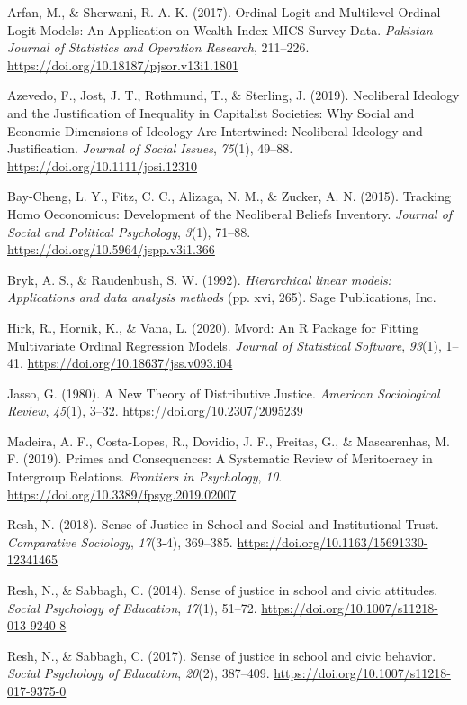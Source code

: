 \documentclass[
  12pt,
]{article}
\newlength{\cslhangindent}
\newenvironment{cslreferences}%
  {\setlength{\parindent}{0pt}%
  \everypar{\setlength{\hangindent}{\cslhangindent}}\ignorespaces}%
  {\par}
\begin{document}
\hypertarget{refs}{}
\begin{cslreferences}
\leavevmode\hypertarget{ref-arfan_Ordinal_2017}{}%
Arfan, M., \& Sherwani, R. A. K. (2017). Ordinal Logit and Multilevel
Ordinal Logit Models: An Application on Wealth Index MICS-Survey Data.
\emph{Pakistan Journal of Statistics and Operation Research}, 211--226.
\url{https://doi.org/10.18187/pjsor.v13i1.1801}

\leavevmode\hypertarget{ref-azevedo_Neoliberal_2019}{}%
Azevedo, F., Jost, J. T., Rothmund, T., \& Sterling, J. (2019).
Neoliberal Ideology and the Justification of Inequality in Capitalist
Societies: Why Social and Economic Dimensions of Ideology Are
Intertwined: Neoliberal Ideology and Justification. \emph{Journal of
Social Issues}, \emph{75}(1), 49--88.
\url{https://doi.org/10.1111/josi.12310}

\leavevmode\hypertarget{ref-bay-cheng_Tracking_2015a}{}%
Bay-Cheng, L. Y., Fitz, C. C., Alizaga, N. M., \& Zucker, A. N. (2015).
Tracking Homo Oeconomicus: Development of the Neoliberal Beliefs
Inventory. \emph{Journal of Social and Political Psychology},
\emph{3}(1), 71--88. \url{https://doi.org/10.5964/jspp.v3i1.366}

\leavevmode\hypertarget{ref-bryk_Hierarchical_1992}{}%
Bryk, A. S., \& Raudenbush, S. W. (1992). \emph{Hierarchical linear
models: Applications and data analysis methods} (pp. xvi, 265). Sage
Publications, Inc.

\leavevmode\hypertarget{ref-hirk_mvord_2020}{}%
Hirk, R., Hornik, K., \& Vana, L. (2020). Mvord: An R Package for
Fitting Multivariate Ordinal Regression Models. \emph{Journal of
Statistical Software}, \emph{93}(1), 1--41.
\url{https://doi.org/10.18637/jss.v093.i04}

\leavevmode\hypertarget{ref-jasso_New_1980}{}%
Jasso, G. (1980). A New Theory of Distributive Justice. \emph{American
Sociological Review}, \emph{45}(1), 3--32.
\url{https://doi.org/10.2307/2095239}

\leavevmode\hypertarget{ref-madeira_Primes_2019}{}%
Madeira, A. F., Costa-Lopes, R., Dovidio, J. F., Freitas, G., \&
Mascarenhas, M. F. (2019). Primes and Consequences: A Systematic Review
of Meritocracy in Intergroup Relations. \emph{Frontiers in Psychology},
\emph{10}. \url{https://doi.org/10.3389/fpsyg.2019.02007}

\leavevmode\hypertarget{ref-resh_Sense_2018}{}%
Resh, N. (2018). Sense of Justice in School and Social and Institutional
Trust. \emph{Comparative Sociology}, \emph{17}(3-4), 369--385.
\url{https://doi.org/10.1163/15691330-12341465}

\leavevmode\hypertarget{ref-resh_Sense_2014}{}%
Resh, N., \& Sabbagh, C. (2014). Sense of justice in school and civic
attitudes. \emph{Social Psychology of Education}, \emph{17}(1), 51--72.
\url{https://doi.org/10.1007/s11218-013-9240-8}

\leavevmode\hypertarget{ref-resh_Sense_2017}{}%
Resh, N., \& Sabbagh, C. (2017). Sense of justice in school and civic
behavior. \emph{Social Psychology of Education}, \emph{20}(2), 387--409.
\url{https://doi.org/10.1007/s11218-017-9375-0}
\end{cslreferences}
\end{document}
